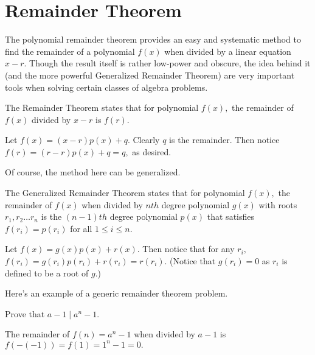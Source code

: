 \documentclass{article}
\begin{document}
\section{Remainder Theorem}
The polynomial remainder theorem provides an easy and systematic method to find the remainder of a polynomial $f(x)$ when divided by a linear equation $x-r.$ Though the result itself is rather low-power and obscure, the idea behind it (and the more powerful Generalized Remainder Theorem) are very important tools when solving certain classes of algebra problems.
\begin{theo}
The Remainder Theorem states that for polynomial $f(x),$ the remainder of $f(x)$ divided by $x-r$ is $f(r).$
\end{theo}

\begin{pro}
Let $f(x)=(x-r)p(x)+q.$ Clearly $q$ is the remainder. Then notice $f(r)=(r-r)p(x)+q=q,$ as desired.
\end{pro}

Of course, the method here can be generalized.
\begin{theo}
The Generalized Remainder Theorem states that for polynomial $f(x),$ the remainder of $f(x)$ when divided by $nth$ degree polynomial $g(x)$ with roots $r_1,r_2\dots r_n$ is the $(n-1)th$ degree polynomial $p(x)$ that satisfies $f(r_i)=p(r_i)$ for all $1\leq i\leq n.$
\end{theo}

\begin{pro}
Let $f(x)=g(x)p(x)+r(x).$ Then notice that for any $r_i,$ $f(r_i)=g(r_i)p(r_i)+r(r_i)=r(r_i).$ (Notice that $g(r_i)=0$ as $r_i$ is defined to be a root of $g.$)
\end{pro}

Here's an example of a generic remainder theorem problem.

\begin{exam}
Prove that $a-1\mid a^n-1.$
\end{exam}

\begin{sol}
The remainder of $f(n)=a^n-1$ when divided by $a-1$ is $f(-(-1))=f(1)=1^n-1=0.$
\end{sol}
\end{document}
